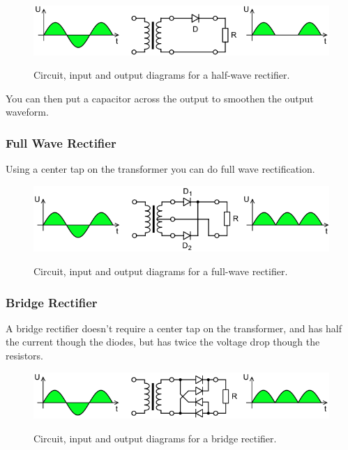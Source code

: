 \begin{figure}[H]
\centering
\href{https://en.wikipedia.org/wiki/Rectifier#/media/File:Halfwave.rectifier.en.svg}{\includegraphics[width=\textwidth]{images/half-wave-rectifier.png}}
\caption{Circuit, input and output diagrams for a half-wave rectifier.}
\end{figure}

You can then put a capacitor across the output to smoothen the output waveform.

\subsubsection{Full Wave Rectifier}

Using a center tap on the transformer you can do full wave rectification.

\begin{figure}[H]
\centering
\href{https://en.wikipedia.org/wiki/Rectifier#/media/File:Fullwave.rectifier.en.svg}{\includegraphics[width=\textwidth]{images/full-wave-rectifier.png}}
\caption{Circuit, input and output diagrams for a full-wave rectifier.}
\end{figure}

\subsubsection{Bridge Rectifier}

A bridge rectifier doesn't require a center tap on the transformer, and has half the current though the diodes, but has twice the voltage drop though the resistors.

\begin{figure}[H]
\centering
\href{https://en.wikipedia.org/wiki/Rectifier#/media/File:Gratz.rectifier.en.svg}{\includegraphics[width=\textwidth]{images/bridge-rectifier.png}}
\caption{Circuit, input and output diagrams for a bridge rectifier.}
\end{figure}

